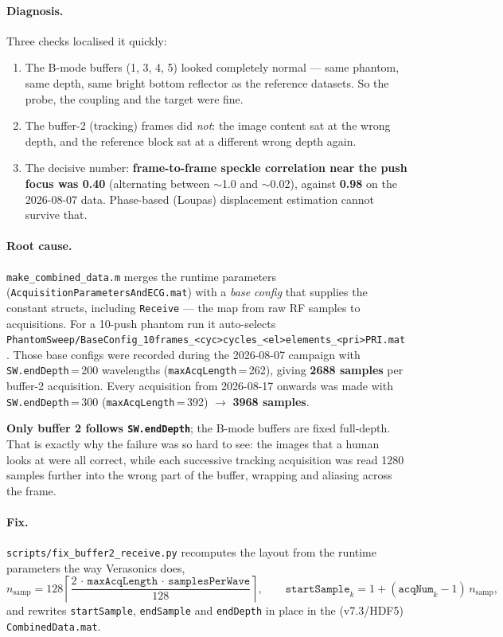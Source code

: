 \documentclass[11pt,a4paper]{article}
\newcommand{\good}[1]{\textcolor{green!45!black}{\textbf{#1}}}
\begin{document}
\paragraph{Diagnosis.} Three checks localised it quickly:
\begin{enumerate}
  \item The B-mode buffers (1, 3, 4, 5) looked completely normal --- same phantom, same depth, same
  bright bottom reflector as the reference datasets. So the probe, the coupling and the target were
  fine.
  \item The buffer-2 (tracking) frames did \emph{not}: the image content sat at the wrong depth, and
  the reference block sat at a different wrong depth again.
  \item The decisive number: \textbf{frame-to-frame speckle correlation near the push focus was
  0.40} (alternating between $\sim$1.0 and $\sim$0.02), against \textbf{0.98} on the 2026-08-07 data.
  Phase-based (Loupas) displacement estimation cannot survive that.
\end{enumerate}

\paragraph{Root cause.} \texttt{make\_combined\_data.m} merges the runtime parameters
(\texttt{AcquisitionParametersAndECG.mat}) with a \emph{base config} that supplies the constant
structs, including \texttt{Receive} --- the map from raw RF samples to acquisitions. For a 10-push
phantom run it auto-selects
\texttt{PhantomSweep/BaseConfig\_10frames\_<cyc>cycles\_<el>elements\_<pri>PRI.mat}. Those base configs
were recorded during the 2026-08-07 campaign with \texttt{SW.endDepth}\,=\,200 wavelengths
(\texttt{maxAcqLength}\,=\,262), giving \textbf{2688 samples} per buffer-2 acquisition. Every
acquisition from 2026-08-17 onwards was made with \texttt{SW.endDepth}\,=\,300
(\texttt{maxAcqLength}\,=\,392) $\rightarrow$ \textbf{3968 samples}.

\good{Only buffer 2 follows \texttt{SW.endDepth}}; the B-mode buffers are fixed full-depth. That is
exactly why the failure was so hard to see: the images that a human looks at were all correct, while
each successive tracking acquisition was read \num{1280} samples further into the wrong part of the
buffer, wrapping and aliasing across the frame.

\paragraph{Fix.} \texttt{scripts/fix\_buffer2\_receive.py} recomputes the layout from the runtime
parameters the way Verasonics does,
\begin{equation}
n_\mathrm{samp} = 128 \left\lceil \frac{2\,\cdot\,\texttt{maxAcqLength}\,\cdot\,
\texttt{samplesPerWave}}{128} \right\rceil ,
\qquad
\texttt{startSample}_k = 1 + (\texttt{acqNum}_k-1)\, n_\mathrm{samp},
\end{equation}
and rewrites \texttt{startSample}, \texttt{endSample} and \texttt{endDepth} in place in the
(v7.3/HDF5) \texttt{CombinedData.mat}.
\end{document}
